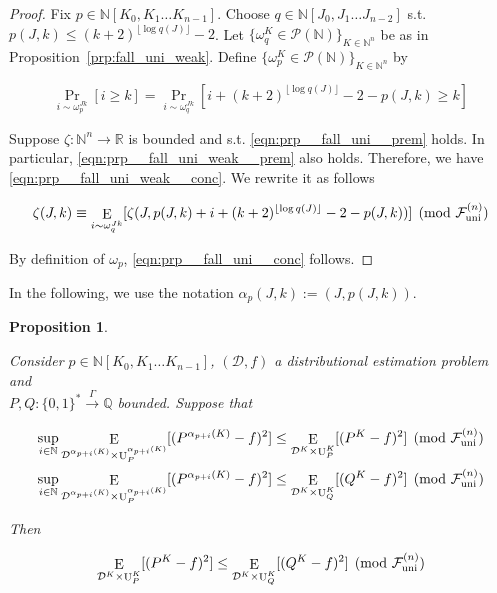 \documentclass[11pt]{article}
\numberwithin{equation}{section}
\theoremstyle{definition}
\theoremstyle{plain}
\newtheorem{proposition}{Proposition}[section]
\newcommand{\Bool}{\{0,1\}}
\newcommand{\Words}{{\Bool^*}}
\DeclareMathOperator{\Prb}{Pr}
\DeclareMathOperator{\E}{E}
\DeclareMathOperator{\Un}{U}
\newcommand{\Nats}{\mathbb{N}}
\newcommand{\Rats}{\mathbb{Q}}
\newcommand{\Reals}{\mathbb{R}}
\newcommand{\NatPoly}{\Nats[K_0, K_1 \ldots K_{n-1}]}
\newcommand{\NatPolyJ}{\Nats[J_0, J_1 \ldots J_{n-2}]}
\newcommand{\NatFun}{\Nats^n \rightarrow}
\newcommand{\Floor}[1]{\lfloor #1 \rfloor}
\newcommand{\Dist}{\mathcal{D}}
\newcommand{\Fall}{\mathcal{F}}
\newcommand{\FallU}{{\Fall_{\textnormal{uni}}^{(n)}}}
\newcommand{\Scheme}{\xrightarrow{\Gamma}}
\begin{document}
\begin{proof}

Fix ${p \in \NatPoly}$. Choose ${q \in \NatPolyJ}$ s.t. ${p(J,k) \leq (k+2)^{\Floor{\log q(J)}}}-2$. Let ${\{\omega_q^K \in \mathcal{P}(\Nats)\}_{K \in \Nats^n}}$ be as in Proposition~\ref{prp:fall_uni_weak}. Define ${\{\omega_p^K \in \mathcal{P}(\Nats)\}_{K \in \Nats^n}}$ by

\[\Prb_{i \sim \omega_p^{Jk}}[i \geq k] = \Prb_{i \sim \omega_q^{Jk}}[i + (k+2)^{\Floor{\log q(J)}} - 2 - p(J,k) \geq k]\]

Suppose ${\zeta: \NatFun \Reals}$ is bounded and s.t. \ref{eqn:prp__fall_uni__prem} holds. In particular, \ref{eqn:prp__fall_uni_weak__prem} also holds. Therefore, we have \ref{eqn:prp__fall_uni_weak__conc}. We rewrite it as follows

\[\zeta(J,k) \equiv \E_{i \sim \omega_q^{Jk}}[\zeta(J, p(J,k) + i+ (k+2)^{\Floor{\log q(J)}} - 2 - p(J,k))] \pmod \FallU\]

By definition of ${\omega_p}$, \ref{eqn:prp__fall_uni__conc} follows.
%
\end{proof}

In the following, we use the notation ${\alpha_{p}(J,k):=(J,p(J,k))}$.

\begin{samepage}
\begin{proposition}
\label{prp:fall_uni_amp}

Consider ${p \in \NatPoly}$, ${(\Dist,f)}$ a distributional estimation problem and\\ ${P,Q: \Words \Scheme \Rats}$ bounded. Suppose that

\begin{align}
\label{eqn:prp__fall_uni_amp__p}\sup_{i \in \Nats} \E_{ \Dist^{\alpha_{p+i}(K)} \times \Un_P^{\alpha_{p+i}(K)}}[(P^{\alpha_{p+i}(K)}-f)^2] &\leq \E_{ \Dist^{K} \times \Un_P^{K}}[(P^{K}-f)^2] \pmod\FallU \\
\label{eqn:prp__fall_uni_amp__q}\sup_{i \in \Nats} \E_{\Dist^{\alpha_{p+i}(K)} \times \Un_P^{\alpha_{p+i}(K)}}[(P^{\alpha_{p+i}(K)}-f)^2] &\leq \E_{\Dist^{K} \times \Un_Q^{K}}[(Q^{K}-f)^2] \pmod\FallU
\end{align}

Then

\begin{equation}
\label{eqn:prp__fall_uni_amp}
\E_{\Dist^{K} \times \Un_P^{K}}[(P^{K}-f)^2] \leq \E_{\Dist^{K} \times \Un_Q^{K}}[(Q^{K}-f)^2] \pmod \FallU
\end{equation}

\end{proposition}
\end{samepage}
\end{document}
